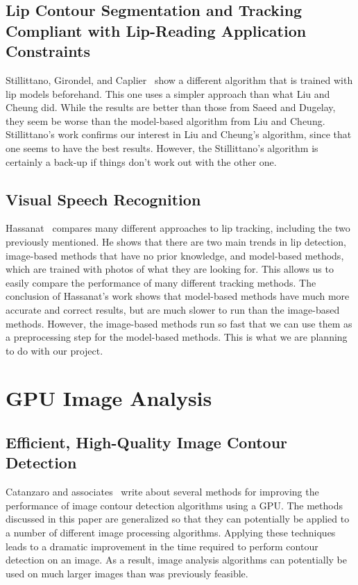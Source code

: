 	\subsection{Lip Contour Segmentation and Tracking Compliant with Lip-Reading Application Constraints}
	
	Stillittano, Girondel, and Caplier~ show a different algorithm that is trained with lip models beforehand. This one uses a simpler approach than what Liu and Cheung did. While the results are better than those from Saeed and Dugelay, they seem be worse than the model-based algorithm from Liu and Cheung. Stillittano's work confirms our interest in Liu and Cheung's algorithm, since that one seems to have the best results. However, the Stillittano's algorithm is certainly a back-up if things don't work out with the other one.
	
	\subsection{Visual Speech Recognition}
	
	Hassanat~ compares many different approaches to lip tracking, including the two previously mentioned. He shows that there are two main trends in lip detection, image-based methods that have no prior knowledge, and model-based methods, which are trained with photos of what they are looking for. This allows us to easily compare the performance of many different tracking methods. The conclusion of Hassanat's work shows that model-based methods have much more accurate and correct results, but are much slower to run than the image-based methods. However, the image-based methods run so fast that we can use them as a preprocessing step for the model-based methods. This is what we are planning to do with our project.


\section{GPU Image Analysis}

	\subsection{Efficient, High-Quality Image Contour Detection}
	
	Catanzaro and associates~ write about several methods for improving the performance of image contour detection algorithms using a GPU. The methods discussed in this paper are generalized so that they can potentially be applied to a number of different image processing algorithms. Applying these techniques leads to a dramatic improvement in the time required to perform contour detection on an image. As a result, image analysis algorithms can potentially be used on much larger images than was previously feasible.
	
